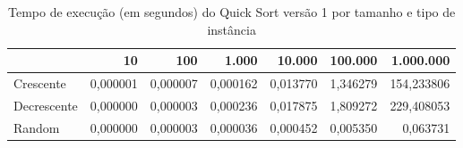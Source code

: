 \begin{table}[htbp]
    \centering
    \begin{tabular}{|l|r|r|r|r|r|r|}
        \hline
         & 10 & 100 & 1.000 & 10.000 & 100.000 & 1.000.000 \\
        \hline
        Crescente & 0,000001 & 0,000007 & 0,000162 & 0,013770 & 1,346279 & 154,233806 \\
        \hline
        Decrescente & 0,000000 & 0,000003 & 0,000236 & 0,017875 & 1,809272 & 229,408053 \\
        \hline
        Random & 0,000000 & 0,000003 & 0,000036 & 0,000452 & 0,005350 & 0,063731 \\
        \hline
    \end{tabular}
    \caption{Tempo de execução (em segundos) do Quick Sort versão 1 por tamanho e tipo de instância}
    \label{tab:tempos_quick_v1}
\end{table}
